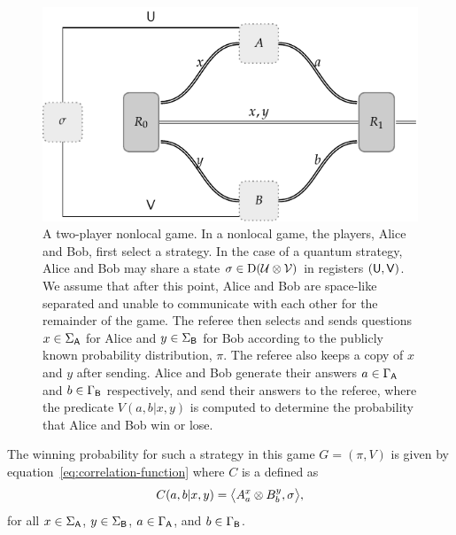 \begin{figure}[!htpb] 
	\begin{center}
		\includegraphics[scale=1.0]{figures/nonlocal_game.pdf}
	\end{center}
		\caption[A two-player nonlocal game.]{A two-player nonlocal game. In a nonlocal game, the players, Alice and Bob, first select a strategy. In the case of a quantum strategy, Alice and Bob may share a state $\sigma \in \mathrm{D}(\mathcal{U} \otimes \mathcal{V})$ in registers $(\mathsf{U},\mathsf{V})$. We assume that after this point, Alice and Bob are space-like separated and unable to communicate with each other for the remainder of the game. The referee then selects and sends questions $x \in \Sigma_{\mathsf{A}}$ for Alice and $y \in \Sigma_{\mathsf{B}}$ for Bob according to the publicly known probability distribution, $\pi$. The referee also keeps a copy of $x$ and $y$ after sending. Alice and Bob generate their answers $a \in \Gamma_{\mathsf{A}}$ and $b \in \Gamma_{\mathsf{B}}$ respectively, and send their answers to the referee, where the predicate $V(a,b|x,y)$ is computed to determine the probability that Alice and Bob win or lose.}
\label{fig:nonlocal-game}
\end{figure}

The winning probability for such a strategy in this game $G = (\pi,V)$ is given by equation~\eqref{eq:correlation-function} where $C$ is a  defined as 
\begin{align}
		C(a,b|x,y) = \bigl\langle A_a^x \otimes B_b^y, \sigma \bigr\rangle,
\end{align}
for all $x \in \Sigma_{\mathsf{A}}$, $y \in \Sigma_{\mathsf{B}}$, $a \in \Gamma_{\mathsf{A}}$, and $b \in \Gamma_{\mathsf{B}}$. 

